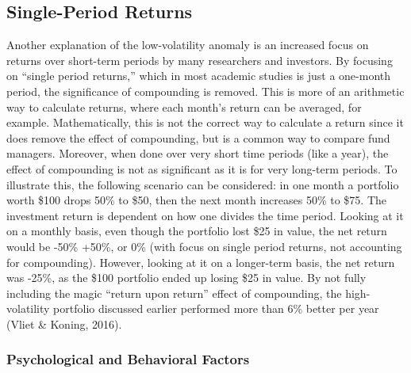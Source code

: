 \documentclass[12pt,twoside]{reedthesis}
\theoremstyle{definition}
\theoremstyle{definition}
\theoremstyle{definition}
\theoremstyle{remark}
\begin{document}
\subsection{Single-Period Returns}\label{single-period-returns}

Another explanation of the low-volatility anomaly is an increased focus
on returns over short-term periods by many researchers and investors. By
focusing on ``single period returns,'' which in most academic studies is
just a one-month period, the significance of compounding is removed.
This is more of an arithmetic way to calculate returns, where each
month's return can be averaged, for example. Mathematically, this is not
the correct way to calculate a return since it does remove the effect of
compounding, but is a common way to compare fund managers. Moreover,
when done over very short time periods (like a year), the effect of
compounding is not as significant as it is for very long-term periods.
To illustrate this, the following scenario can be considered: in one
month a portfolio worth \$100 drops 50\% to \$50, then the next month
increases 50\% to \$75. The investment return is dependent on how one
divides the time period. Looking at it on a monthly basis, even though
the portfolio lost \$25 in value, the net return would be -50\% +50\%,
or 0\% (with focus on single period returns, not accounting for
compounding). However, looking at it on a longer-term basis, the net
return was -25\%, as the \$100 portfolio ended up losing \$25 in value.
By not fully including the magic ``return upon return'' effect of
compounding, the high-volatility portfolio discussed earlier performed
more than 6\% better per year (Vliet \& Koning, 2016).

\subsubsection{Psychological and Behavioral
Factors}\label{psychological-and-behavioral-factors}
\end{document}
